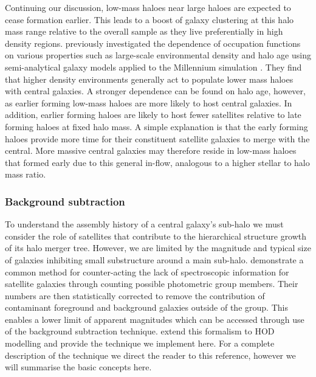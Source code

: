 Continuing our discussion, low-mass haloes near large haloes are expected to cease formation earlier. This leads to a boost of galaxy clustering at this halo mass range relative to the overall sample as they live preferentially in high density regions. \citet{zehavi2018} previously investigated the dependence of occupation functions on various properties such as large-scale environmental density and halo age using semi-analytical galaxy models applied to the Millennium simulation \citep{springel2005} \citep[See also;][who confirmed these results using the hydro simulations of EAGLE and Illustris]{artale2018}. They find that higher density environments generally act to populate lower mass haloes with central galaxies. A stronger dependence can be found on halo age, however, as earlier forming low-mass haloes are more likely to host central galaxies. In addition, earlier forming haloes are likely to host fewer satellites relative to late forming haloes at fixed halo mass. A simple explanation is that the early forming haloes provide more time for their constituent satellite galaxies to merge with the central. More massive central galaxies may therefore reside in low-mass haloes that formed early due to this general in-flow, analogous to a higher stellar to halo mass ratio. 

\subsubsection{Background subtraction}
To understand the assembly history of a central galaxy's sub-halo we must consider the role of satellites that contribute to the hierarchical structure growth of its halo merger tree. However, we are limited by the magnitude and typical size of galaxies inhibiting small substructure around a main sub-halo. \citet{liu2011} demonstrate a common method for counter-acting the lack of spectroscopic information for satellite galaxies through counting possible photometric group members. Their numbers are then statistically corrected to remove the contribution of contaminant foreground and background galaxies outside of the group. This enables a lower limit of apparent magnitudes which can be accessed through use of the background subtraction technique. \citet{rodriguez2015} extend this formalism to HOD modelling and provide the technique we implement here. For a complete description of the technique we direct the reader to this reference, however we will summarise the basic concepts here.

